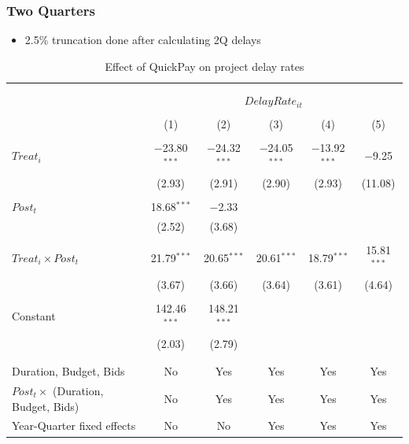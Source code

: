 \documentclass[
]{article}
\providecommand{\tightlist}{%
  \setlength{\itemsep}{0pt}\setlength{\parskip}{0pt}}
\begin{document}
\hypertarget{two-quarters-5}{%
\subsubsection{Two Quarters}\label{two-quarters-5}}

\begin{itemize}
\tightlist
\item
  2.5\% truncation done after calculating 2Q delays
\end{itemize}

\begin{table}[H] \centering 
  \caption{Effect of QuickPay on project delay rates} 
  \label{} 
\small 
\begin{tabular}{@{\extracolsep{-2pt}}lccccc} 
\\[-1.8ex]\hline 
\hline \\[-1.8ex] 
\\[-1.8ex] & \multicolumn{5}{c}{$DelayRate_{it}$} \\ 
\\[-1.8ex] & (1) & (2) & (3) & (4) & (5)\\ 
\hline \\[-1.8ex] 
 $Treat_i$ & $-$23.80$^{***}$ & $-$24.32$^{***}$ & $-$24.05$^{***}$ & $-$13.92$^{***}$ & $-$9.25 \\ 
  & (2.93) & (2.91) & (2.90) & (2.93) & (11.08) \\ 
  & & & & & \\ 
 $Post_t$ & 18.68$^{***}$ & $-$2.33 &  &  &  \\ 
  & (2.52) & (3.68) &  &  &  \\ 
  & & & & & \\ 
 $Treat_i \times Post_t$ & 21.79$^{***}$ & 20.65$^{***}$ & 20.61$^{***}$ & 18.79$^{***}$ & 15.81$^{***}$ \\ 
  & (3.67) & (3.66) & (3.64) & (3.61) & (4.64) \\ 
  & & & & & \\ 
 Constant & 142.46$^{***}$ & 148.21$^{***}$ &  &  &  \\ 
  & (2.03) & (2.79) &  &  &  \\ 
  & & & & & \\ 
\hline \\[-1.8ex] 
Duration, Budget, Bids & No & Yes & Yes & Yes & Yes \\ 
$Post_t \times$  (Duration, Budget, Bids) & No & Yes & Yes & Yes & Yes \\ 
Year-Quarter fixed effects & No & No & Yes & Yes & Yes \\ 

\end{tabular}
\end{table}
\end{document}
